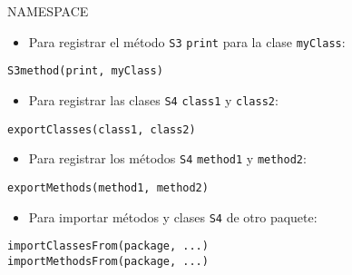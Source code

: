 \documentclass[xcolor={usenames,svgnames,dvipsnames}]{beamer}
\begin{document}
\begin{frame}[fragile,label={sec:org5e27dcd}]{NAMESPACE}
 \begin{itemize}
\item Para registrar el método \texttt{S3} \texttt{print} para la clase \texttt{myClass}:
\end{itemize}
\lstset{language=r,label= ,caption= ,captionpos=b,numbers=none}
\begin{lstlisting}
S3method(print, myClass)
\end{lstlisting}
\begin{itemize}
\item Para registrar las clases \texttt{S4} \texttt{class1} y \texttt{class2}:
\end{itemize}
\lstset{language=r,label= ,caption= ,captionpos=b,numbers=none}
\begin{lstlisting}
exportClasses(class1, class2)
\end{lstlisting}
\begin{itemize}
\item Para registrar los métodos \texttt{S4} \texttt{method1} y \texttt{method2}:
\end{itemize}
\lstset{language=r,label= ,caption= ,captionpos=b,numbers=none}
\begin{lstlisting}
exportMethods(method1, method2)
\end{lstlisting}
\begin{itemize}
\item Para importar métodos y clases \texttt{S4} de otro paquete:
\end{itemize}
\lstset{language=r,label= ,caption= ,captionpos=b,numbers=none}
\begin{lstlisting}
importClassesFrom(package, ...)
importMethodsFrom(package, ...)
\end{lstlisting}
\end{frame}
\end{document}
